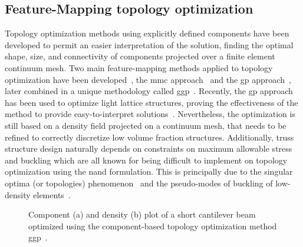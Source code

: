 \subsection{Feature-Mapping topology optimization}
Topology optimization methods using explicitly defined components have been developed to permit an easier interpretation of the solution, finding the optimal shape, size, and connectivity of components projected over a finite element continuum mesh. Two main feature-mapping methods applied to topology optimization have been developed~, the \gls{mmc} approach~
and the \gls{gp} approach~, later combined in a unique methodology called \gls{ggp}~. Recently, the \gls{gp} approach has been used to optimize light lattice structures, proving the effectiveness of the method to provide easy-to-interpret solutions~. Nevertheless, the optimization is still based on a density field projected on a continuum mesh, that needs to be refined to correctly discretize low volume fraction structures. Additionally, truss structure design naturally depends on constraints on maximum allowable stress and buckling which are all known for being difficult to implement on topology optimization using the \gls{nand} formulation. This is principally due to the singular optima (or topologies) phenomenon~ and the pseudo-modes of buckling of low-density elements~. \begin{figure}
    \hspace*{\fill}
    \hfill
    \hspace*{\fill}
    \caption{Component (a) and density (b) plot of a short cantilever beam optimized using the component-based topology optimization method \gls{ggp}~\cite{coniglio_generalized_2020}.}
    \label{fig:03_to_plot}
\end{figure}

